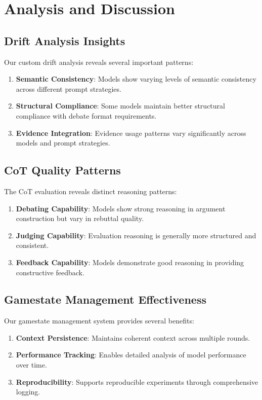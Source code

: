 \documentclass[11pt]{article}
\begin{document}
\section{Analysis and Discussion}

\subsection{Drift Analysis Insights}

Our custom drift analysis reveals several important patterns:

\begin{enumerate}
    \item \textbf{Semantic Consistency}: Models show varying levels of semantic consistency across different prompt strategies.
    \item \textbf{Structural Compliance}: Some models maintain better structural compliance with debate format requirements.
    \item \textbf{Evidence Integration}: Evidence usage patterns vary significantly across models and prompt strategies.
\end{enumerate}

\subsection{CoT Quality Patterns}

The CoT evaluation reveals distinct reasoning patterns:

\begin{enumerate}
    \item \textbf{Debating Capability}: Models show strong reasoning in argument construction but vary in rebuttal quality.
    \item \textbf{Judging Capability}: Evaluation reasoning is generally more structured and consistent.
    \item \textbf{Feedback Capability}: Models demonstrate good reasoning in providing constructive feedback.
\end{enumerate}

\subsection{Gamestate Management Effectiveness}

Our gamestate management system provides several benefits:

\begin{enumerate}
    \item \textbf{Context Persistence}: Maintains coherent context across multiple rounds.
    \item \textbf{Performance Tracking}: Enables detailed analysis of model performance over time.
    \item \textbf{Reproducibility}: Supports reproducible experiments through comprehensive logging.
\end{enumerate}
\end{document}
